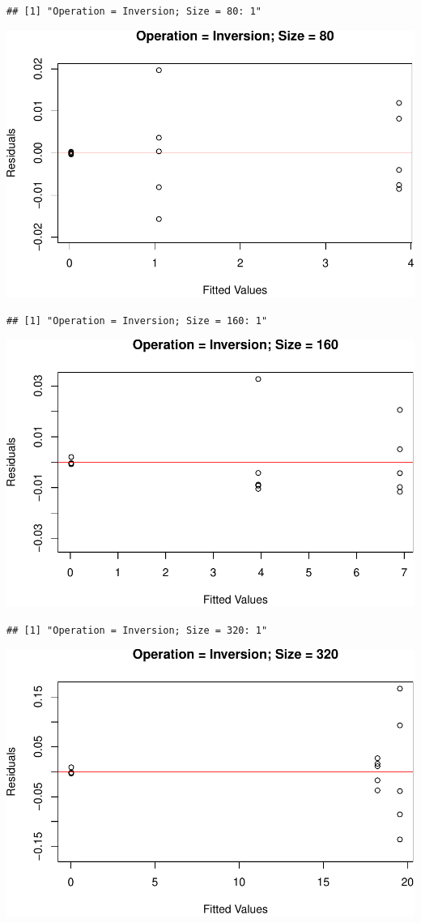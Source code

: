 \documentclass[
]{article}
\begin{document}
\begin{verbatim}
## [1] "Operation = Inversion; Size = 80: 1"
\end{verbatim}

\includegraphics{main_files/figure-latex/unnamed-chunk-20-20.pdf}

\begin{verbatim}
## [1] "Operation = Inversion; Size = 160: 1"
\end{verbatim}

\includegraphics{main_files/figure-latex/unnamed-chunk-20-21.pdf}

\begin{verbatim}
## [1] "Operation = Inversion; Size = 320: 1"
\end{verbatim}

\includegraphics{main_files/figure-latex/unnamed-chunk-20-22.pdf}
\end{document}
